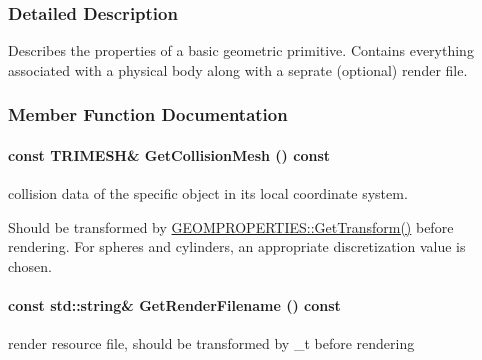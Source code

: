 \subsubsection{Detailed Description}
Describes the properties of a basic geometric primitive. Contains everything associated with a physical body along with a seprate (optional) render file. 

\subsubsection{Member Function Documentation}
\hypertarget{classOpenRAVE_1_1KinBody_1_1Link_1_1GEOMPROPERTIES_a387688dd5bde34a4dd34be211886a8d1}{
\paragraph[{GetCollisionMesh}]{\setlength{\rightskip}{0pt plus 5cm}const {\bf TRIMESH}\& GetCollisionMesh () const}\hfill}
\label{classOpenRAVE_1_1KinBody_1_1Link_1_1GEOMPROPERTIES_a387688dd5bde34a4dd34be211886a8d1}


collision data of the specific object in its local coordinate system. 

Should be transformed by \hyperlink{classOpenRAVE_1_1KinBody_1_1Link_1_1GEOMPROPERTIES_aaf48415e05caa5f9a9c3fa88cb8ed8a9}{GEOMPROPERTIES::GetTransform()} before rendering. For spheres and cylinders, an appropriate discretization value is chosen. \hypertarget{classOpenRAVE_1_1KinBody_1_1Link_1_1GEOMPROPERTIES_a4474cb22f6457503715435d2f3e34496}{
\paragraph[{GetRenderFilename}]{\setlength{\rightskip}{0pt plus 5cm}const std::string\& GetRenderFilename () const}\hfill}
\label{classOpenRAVE_1_1KinBody_1_1Link_1_1GEOMPROPERTIES_a4474cb22f6457503715435d2f3e34496}


render resource file, should be transformed by \_\-t before rendering 

